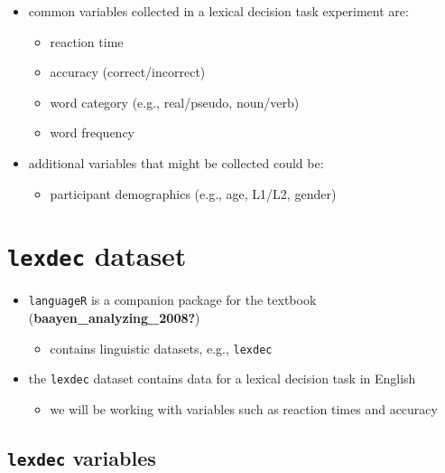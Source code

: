 \documentclass[
  letterpaper,
  DIV=11]{scrartcl}
\providecommand{\tightlist}{%
  \setlength{\itemsep}{0pt}\setlength{\parskip}{0pt}}\usepackage{longtable,booktabs,array}
\theoremstyle{definition}
\theoremstyle{remark}
\begin{document}
\begin{itemize}
\tightlist
\item
  common variables collected in a lexical decision task experiment are:

  \begin{itemize}
  \tightlist
  \item
    reaction time
  \item
    accuracy (correct/incorrect)
  \item
    word category (e.g., real/pseudo, noun/verb)
  \item
    word frequency
  \end{itemize}
\item
  additional variables that might be collected could be:

  \begin{itemize}
  \tightlist
  \item
    participant demographics (e.g., age, L1/L2, gender)
  \end{itemize}
\end{itemize}

\hypertarget{lexdec-dataset}{%
\section{\texorpdfstring{\texttt{lexdec}
dataset}{lexdec dataset}}\label{lexdec-dataset}}

\begin{itemize}
\tightlist
\item
  \texttt{languageR} is a companion package for the textbook
  (\textbf{baayen\_analyzing\_2008?})

  \begin{itemize}
  \tightlist
  \item
    contains linguistic datasets, e.g., \texttt{lexdec}
  \end{itemize}
\item
  the \texttt{lexdec} dataset contains data for a lexical decision task
  in English

  \begin{itemize}
  \tightlist
  \item
    we will be working with variables such as reaction times and
    accuracy
  \end{itemize}
\end{itemize}

\hypertarget{lexdec-variables}{%
\subsection{\texorpdfstring{\texttt{lexdec}
variables}{lexdec variables}}\label{lexdec-variables}}
\end{document}
